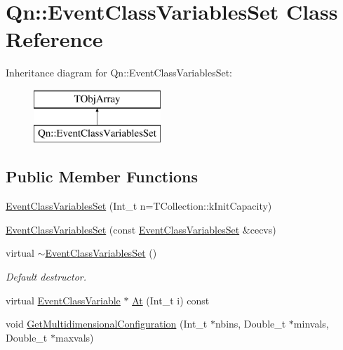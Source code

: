 \hypertarget{classQn_1_1EventClassVariablesSet}{}\section{Qn\+:\+:Event\+Class\+Variables\+Set Class Reference}
\label{classQn_1_1EventClassVariablesSet}
Inheritance diagram for Qn\+:\+:Event\+Class\+Variables\+Set\+:\begin{figure}[H]
\begin{center}
\leavevmode
\includegraphics[height=2.000000cm]{classQn_1_1EventClassVariablesSet}
\end{center}
\end{figure}
\subsection*{Public Member Functions}
\begin{DoxyCompactItemize}
\item 
\mbox{\hyperlink{classQn_1_1EventClassVariablesSet_a8c2360e64025b5f131be1125ab36b5cb}{Event\+Class\+Variables\+Set}} (Int\+\_\+t n=T\+Collection\+::k\+Init\+Capacity)
\item 
\mbox{\hyperlink{classQn_1_1EventClassVariablesSet_a9e9e764f25f841650d6a5f053e61df77}{Event\+Class\+Variables\+Set}} (const \mbox{\hyperlink{classQn_1_1EventClassVariablesSet}{Event\+Class\+Variables\+Set}} \&cecvs)
\item 
\mbox{\label{classQn_1_1EventClassVariablesSet_a981991d6e1983a826e8c7ac3c47fff2f}} 
virtual \mbox{\hyperlink{classQn_1_1EventClassVariablesSet_a981991d6e1983a826e8c7ac3c47fff2f}{$\sim$\+Event\+Class\+Variables\+Set}} ()
\begin{DoxyCompactList}\small\item\em Default destructor. \end{DoxyCompactList}\item 
virtual \mbox{\hyperlink{classQn_1_1EventClassVariable}{Event\+Class\+Variable}} $\ast$ \mbox{\hyperlink{classQn_1_1EventClassVariablesSet_a774502be50fb3609d911872e0d1f3f3a}{At}} (Int\+\_\+t i) const
\item 
void \mbox{\hyperlink{classQn_1_1EventClassVariablesSet_a24d5fb123ec23c08a07268a736312593}{Get\+Multidimensional\+Configuration}} (Int\+\_\+t $\ast$nbins, Double\+\_\+t $\ast$minvals, Double\+\_\+t $\ast$maxvals)
\end{DoxyCompactItemize}



